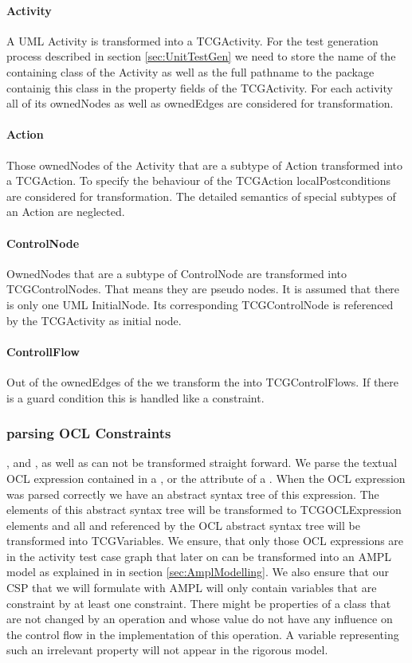 \paragraph{Activity}
A UML Activity is transformed into a TCGActivity. For the test generation process described in section \ref{sec:UnitTestGen} we need to store the name of the containing class of the Activity as well as the full pathname to the package containig this class in the property fields of the TCGActivity. For each activity all of its ownedNodes as well as ownedEdges are considered for transformation.
\paragraph{Action} Those ownedNodes of the Activity that are a subtype of Action transformed into a TCGAction. To specify the behaviour of the TCGAction localPostconditions are considered for transformation. The detailed semantics of special subtypes of an Action are neglected.
\paragraph{ControlNode}OwnedNodes that are a subtype of ControlNode are transformed into TCGControlNodes. That means they are pseudo nodes. It is assumed that there is only one UML InitialNode. Its corresponding TCGControlNode is referenced by the TCGActivity as initial node.
\paragraph{ControllFlow} Out of the ownedEdges of the  we transform the  into TCGControlFlows. If there is a guard condition this is handled like a constraint.

\subsubsection{parsing OCL Constraints}
, and , as well as  can not be transformed straight forward. We parse the textual OCL expression contained in a , or the  attribute of a . When the OCL expression was parsed correctly we have an abstract syntax tree of this expression. The elements of this abstract syntax tree will be transformed to TCGOCLExpression elements and all  and  referenced by the OCL abstract syntax tree will be transformed into TCGVariables. We ensure, that only those OCL expressions are in the activity test case graph that later on can be transformed into an AMPL model as explained in in section \ref{sec:AmplModelling}. We also ensure that our CSP that we will formulate with AMPL will only contain variables that are constraint by at least one constraint. There might be properties of a class that are not changed by an operation and whose value do not have any influence on the control flow in the implementation of this operation. A variable representing such an irrelevant property will not appear in the rigorous model.
